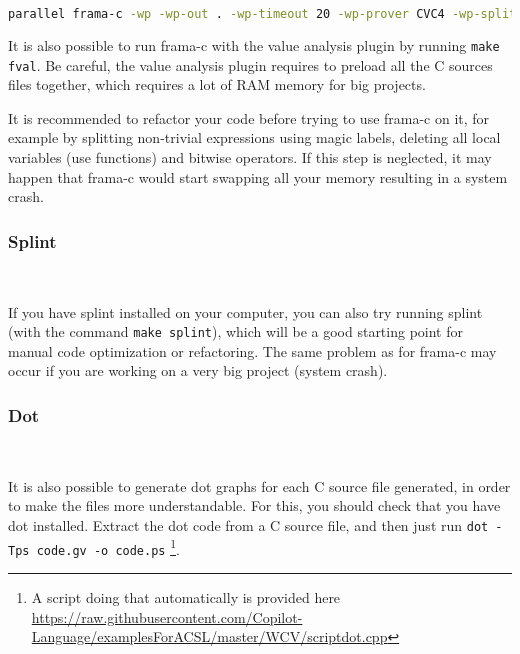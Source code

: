 \begin{figure*}[!htb]
	\begin{lstlisting}[frame=none, language=bash]
parallel frama-c -wp -wp-out . -wp-timeout 20 -wp-prover CVC4 -wp-split {} ::: *.c | tee >logfwp >(grep 'Proved\|Unknown\|Timeout\|Failed\|Qed:\s\|CVC4:\s\|Parsing .*\.c' > logfwpcompact) >(grep 'Proved\|Qed:\s\|CVC4:\s\|Unknown\|Timeout\|Failed\|Parsing .*\.c')

	\end{lstlisting}
	\caption{The bash command.}
	\label{fig:fwp}
\end{figure*}

It is also possible to run frama-c with the value analysis plugin by running
\texttt{make fval}. Be careful, the value analysis plugin requires to preload
all the C sources files together, which requires a lot of RAM memory for big
projects.

It is recommended to refactor your code before trying to use frama-c on it, for
example by splitting non-trivial expressions using magic labels, deleting all
local variables (use functions) and bitwise operators. If this step is
neglected, it may happen that frama-c would start swapping all your memory
resulting in a system crash.

\subsubsection{Splint}~\label{subsec:splint}

If you have splint installed on your computer, you can also try running splint
(with the command \texttt{make splint}), which will be a good starting point
for manual code optimization or refactoring. The same problem as for frama-c
may occur if you are working on a very big project (system crash).

\subsubsection{Dot}~\label{subsec:dot}

It is also possible to generate dot graphs for each C source file generated, in
order to make the files more understandable. For this, you should check that
you have dot installed. Extract the dot code from a C source file, and then
just run \texttt{dot -Tps code.gv -o code.ps}
%
\footnote{A script doing that automatically is provided here
\url{https://raw.githubusercontent.com/Copilot-Language/examplesForACSL/master/WCV/scriptdot.cpp}}.

